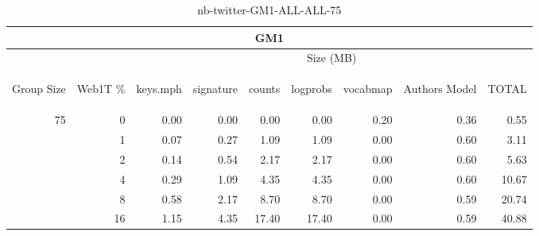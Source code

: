 \begin{center}
\begin{table}[htbp]
\begin{tabular}{ | r | r | r | r | r | r | r | r | r |}
\hline
\multicolumn{9}{|c|}{GM1}\\
\hline
 & & \multicolumn{7}{|c|}{Size (MB)}\\ \cline{3-9}
\begin{sideways}Group Size\end{sideways} & \begin{sideways}Web1T \% \end{sideways} & \begin{sideways}keys.mph\end{sideways} & \begin{sideways}signature\end{sideways} & \begin{sideways}counts\end{sideways} & \begin{sideways}logprobs\end{sideways} & \begin{sideways}vocabmap\end{sideways} & \begin{sideways}Authors Model \end{sideways} & \begin{sideways}TOTAL\end{sideways}\\
\hline
\multirow{5}{*}{75}
 & 0 & 0.00 & 0.00 & 0.00 & 0.00 & 0.20 & 0.36 & 0.55\\ \cline{2-9}
 & 1 & 0.07 & 0.27 & 1.09 & 1.09 & 0.00 & 0.60 & 3.11\\ \cline{2-9}
 & 2 & 0.14 & 0.54 & 2.17 & 2.17 & 0.00 & 0.60 & 5.63\\ \cline{2-9}
 & 4 & 0.29 & 1.09 & 4.35 & 4.35 & 0.00 & 0.60 & 10.67\\ \cline{2-9}
 & 8 & 0.58 & 2.17 & 8.70 & 8.70 & 0.00 & 0.59 & 20.74\\ \cline{2-9}
 & 16 & 1.15 & 4.35 & 17.40 & 17.40 & 0.00 & 0.59 & 40.88\\ \cline{2-9}
\hline
\end{tabular}
\caption{nb-twitter-GM1-ALL-ALL-75}
\label{table:nb-twitter-GM1-ALL-ALL-75}
\end{table}
\end{center}

